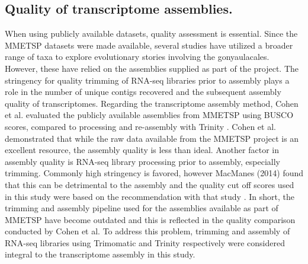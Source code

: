 \documentclass[12pt]{article}
\begin{document}
\subsection*{Quality of transcriptome assemblies.}
When using publicly available datasets, quality assessment is essential. 
Since the MMETSP datasets were made available, several studies have utilized a broader range of taxa to explore evolutionary stories involving the gonyaulacales. 
However, these have relied on the assemblies supplied as part of the project. 
The stringency for quality trimming of RNA-seq libraries prior to assembly plays a role in the number of unique contigs recovered and the subsequent assembly quality of transcriptomes. 
Regarding the transcriptome assembly method, Cohen et al. evaluated the publicly available assemblies from MMETSP using BUSCO scores, compared to processing and re-assembly with Trinity \cite{cohen-reass}. 
Cohen et al. demonstrated that while the raw data available from the MMETSP project is an excellent resource, the assembly quality is less than ideal. 
Another factor in assembly quality is RNA-seq library processing prior to assembly, especially trimming. 
Commonly high stringency is favored, however MacManes (2014) found that this can be detrimental to the assembly and the quality cut off scores used in this study were based on the recommendation with that study \cite{macmanes2014optimal}.
In short, the trimming and assembly pipeline used for the assemblies available as part of MMETSP have become outdated and this is reflected in the quality comparison conducted by Cohen et al. 
To address this problem, trimming and assembly of RNA-seq libraries using Trimomatic and Trinity respectively were considered integral to the transcriptome assembly in this study.
\end{document}
